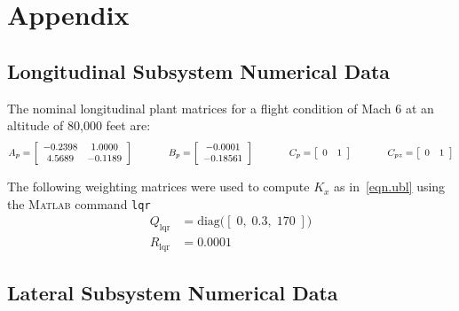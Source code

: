 \documentclass[]{../sty/aiaa-tc}
\begin{document}
  \section*{Appendix}

  \subsection*{Longitudinal Subsystem Numerical Data}

  The nominal longitudinal plant matrices for a flight condition of Mach 6 at an altitude of 80,000 feet are:
  \begin{equation*}
    A_{p}=
    \left[
    \begin{array}{cccc}
      -0.2398 & 1.0000 \\
      4.5689 & -0.1189
    \end{array}\right]
    \hspace{0.5in}
    B_{p}=
    \left[
    \begin{array}{ccccc}
      -0.0001 \\
      -0.18561
    \end{array}\right]
    \hspace{0.5in}
    C_{p}=
    \left[
    \begin{array}{ccccc}
      0 & 1
    \end{array}\right]
    \hspace{0.5in}
    C_{pz}=
    \left[
    \begin{array}{ccccc}
      0 & 1
    \end{array}\right]
  \end{equation*}

  The following weighting matrices were used to compute $K_{x}$ as in\ \eqref{eqn.ubl} using the \textsc{Matlab} command \texttt{lqr}
  \begin{align*}
    Q_{\text{lqr}}&=\text{diag}\bigr(
    [\; 0, \; 0.3, \; 170 \; ]\bigr) \\
    R_{\text{lqr}}&=0.0001
  \end{align*}

  \subsection*{Lateral Subsystem Numerical Data}
\end{document}
